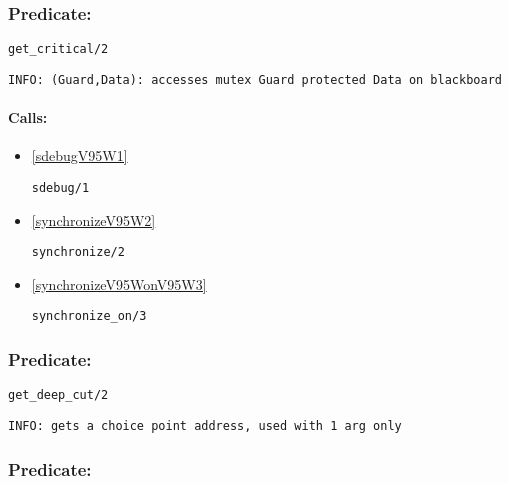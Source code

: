 \subsubsection{Predicate:} \label{getV95WcriticalV95W2}

\begin{verbatim}
get_critical/2
\end{verbatim}

{\small \begin{verbatim}
INFO: (Guard,Data): accesses mutex Guard protected Data on blackboard

\end{verbatim}}
\paragraph{Calls:} 
\begin{itemize}
\item \ref{sdebugV95W1} 
\begin{verbatim}
sdebug/1
\end{verbatim}

\item \ref{synchronizeV95W2} 
\begin{verbatim}
synchronize/2
\end{verbatim}

\item \ref{synchronizeV95WonV95W3} 
\begin{verbatim}
synchronize_on/3
\end{verbatim}

\end{itemize}

\subsubsection{Predicate:} \label{getV95WdeepV95WcutV95W2}

\begin{verbatim}
get_deep_cut/2
\end{verbatim}

{\small \begin{verbatim}
INFO: gets a choice point address, used with 1 arg only

\end{verbatim}}

\subsubsection{Predicate:} \label{getV95WengineV95WidV95W2}

